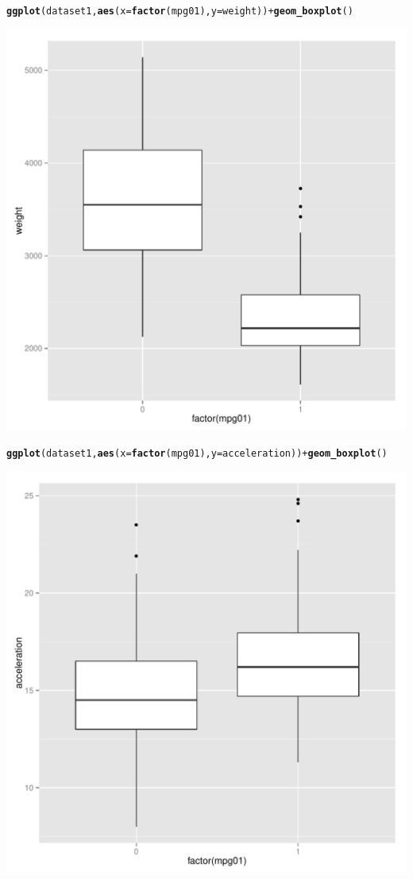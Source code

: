 \documentclass{article}\usepackage[]{graphicx}\usepackage[]{color}
\makeatletter
\def\maxwidth{ %
  \ifdim\Gin@nat@width>\linewidth
    \linewidth
  \else
    \Gin@nat@width
  \fi
}
\newcommand{\hlopt}[1]{\textcolor[rgb]{0,0,0}{#1}}%
\newcommand{\hlstd}[1]{\textcolor[rgb]{0.345,0.345,0.345}{#1}}%
\newcommand{\hlkwc}[1]{\textcolor[rgb]{0.333,0.667,0.333}{#1}}%
\newcommand{\hlkwd}[1]{\textcolor[rgb]{0.737,0.353,0.396}{\textbf{#1}}}%
\newenvironment{kframe}{%
 \def\at@end@of@kframe{}%
 \ifinner\ifhmode%
  \def\at@end@of@kframe{\end{minipage}}%
  \begin{minipage}{\columnwidth}%
 \fi\fi%
 \def\FrameCommand##1{\hskip\@totalleftmargin \hskip-\fboxsep
 \colorbox{shadecolor}{##1}\hskip-\fboxsep
     \hskip-\linewidth \hskip-\@totalleftmargin \hskip\columnwidth}%
 \MakeFramed {\advance\hsize-\width
   \@totalleftmargin\z@ \linewidth\hsize
   \@setminipage}}%
 {\par\unskip\endMakeFramed%
 \at@end@of@kframe}
\newenvironment{knitrout}{}{} %
\makeatother
\begin{document}
\begin{enumerate}[(a)]
\begin{knitrout}
\begin{kframe}\begin{alltt}
\hlkwd{ggplot}\hlstd{(dataset1,} \hlkwd{aes}\hlstd{(}\hlkwc{x}\hlstd{=}\hlkwd{factor}\hlstd{(mpg01),} \hlkwc{y}\hlstd{=weight))}\hlopt{+}\hlkwd{geom_boxplot}\hlstd{()}
\end{alltt}
\end{kframe}
\includegraphics[width=\maxwidth]{figure/unnamed-chunk-7-5} 
\begin{kframe}\begin{alltt}
\hlkwd{ggplot}\hlstd{(dataset1,} \hlkwd{aes}\hlstd{(}\hlkwc{x}\hlstd{=}\hlkwd{factor}\hlstd{(mpg01),} \hlkwc{y}\hlstd{=acceleration))}\hlopt{+}\hlkwd{geom_boxplot}\hlstd{()}
\end{alltt}
\end{kframe}
\includegraphics[width=\maxwidth]{figure/unnamed-chunk-7-6} 

\end{knitrout}
\end{enumerate}
\end{document}
